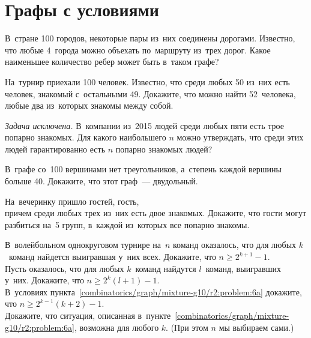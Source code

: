 
\section*{Графы с условиями}


\begin{problems}

\item
В~стране 100 городов, некоторые пары из~них соединены дорогами.
Известно, что любые 4~города можно объехать по~маршруту из~трех дорог.
Какое наименьшее количество ребер может быть в~таком графе?

\item
На~турнир приехали 100 человек.
Известно, что среди любых 50 из~них есть человек, знакомый с~остальными 49.
Докажите, что можно найти 52~человека, любые два из~которых знакомы между
собой.

\item \emph{Задача исключена.}
В~компании из~2015 людей среди любых пяти есть трое попарно знакомых.
Для какого наибольшего $n$ можно утверждать, что среди этих людей
гарантированно есть $n$ попарно знакомых людей?

\item
В~графе со~100 вершинами нет треугольников, а~степень каждой вершины больше 40.
Докажите, что этот граф~--- двудольный.

\item
На~вечеринку пришло
\quad
{} гостей,
\quad
{} гость,
\\
причем среди любых трех из~них есть двое знакомых.
Докажите, что гости могут разбиться на~5 групп, в~каждой из~которых
все попарно знакомы.

\item
\subproblem
\label{combinatorics/graph/mixture-g10/r2:problem:6a}%
В~волейбольном однокруговом турнире на~$n$ команд оказалось, что для любых
$k$~команд найдется выигравшая у~них всех.
Докажите, что\enspace
$n \geq 2^{k+1} - 1$.
\\
\subproblem
Пусть оказалось, что для любых $k$~команд найдутся $l$~команд, выигравших
у~них.
Докажите, что\enspace
$n \geq 2^k (l + 1) - 1$.
\\
\subproblem
В~условиях пункта~\ref{combinatorics/graph/mixture-g10/r2:problem:6a}
докажите, что\enspace
$n \geq 2^{k-1} (k + 2) - 1$.
\\
\subproblem
Докажите, что ситуация, описанная
в~пункте~\ref{combinatorics/graph/mixture-g10/r2:problem:6a},
возможна для любого $k$. (При этом $n$ мы выбираем сами.)

\end{problems}

